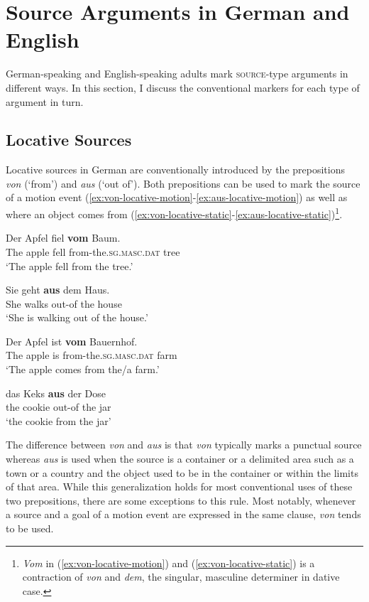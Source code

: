 \documentclass[lucida]{sp} %
\begin{document}
\section{Source Arguments in German and English}
\label{sec:marking}

German-speaking and English-speaking adults mark \textsc{source}-type arguments in different ways. In this section, I discuss the conventional markers for each type of argument in turn.

\subsection{Locative Sources}

Locative sources in German are conventionally introduced by the prepositions \textit{von} (`{from}') and \textit{aus} (`out of'). Both prepositions can be used to mark the source of a motion event (\ref{ex:von-locative-motion}-\ref{ex:aus-locative-motion}) as well as where an object comes from  (\ref{ex:von-locative-static}-\ref{ex:aus-locative-static})\footnote{\textit{Vom} in (\ref{ex:von-locative-motion}) and (\ref{ex:von-locative-static}) is a contraction of \textit{von} and \textit{dem}, the singular, masculine determiner in dative case.}.

\begin{exe}
\ex \label{ex:von-locative-motion} \gll Der Apfel fiel \textbf{vom} Baum. \\
The apple fell from-the.\textsc{sg}.\textsc{masc}.\textsc{dat} tree\\
`The apple fell from the tree.'

\ex \label{ex:aus-locative-motion} \gll  Sie geht \textbf{aus} dem Haus. \\
She walks out-of the house \\
`She is walking out of the house.' 

\ex \label{ex:von-locative-static} \gll Der Apfel ist \textbf{vom} Bauernhof. \\
The apple is from-the.\textsc{sg}.\textsc{masc}.\textsc{dat} farm\\
`The apple comes from the/a farm.'

\ex \label{ex:aus-locative-static} \gll das Keks \textbf{aus} der Dose \\
the cookie out-of the jar \\
`the cookie from the jar' 
\end{exe}
The difference between \textit{von} and \textit{aus} is that \textit{von} typically marks a punctual source whereas \textit{aus} is used when the source is a container or a delimited area such as a town or a country and the object used to be in the container or within the limits of that area. While this generalization holds for most conventional uses of these two prepositions, there are some exceptions to this rule. Most notably, whenever a source and a goal of a motion event are expressed in the same clause, \textit{von} tends to be used.
\end{document}
